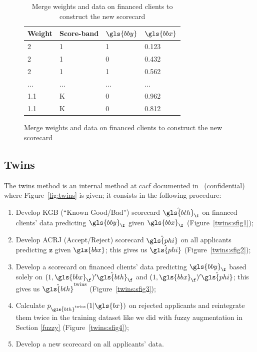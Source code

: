 \begin{table}
{\begin{multicols}{3}
\columnbreak

\begin{subfigure}[t]{0.31\textwidth}
\begin{center}
\begin{adjustbox}{max width=0.95\textwidth}

\begin{tabular}{l l l l}
\toprule
\textbf{Weight} & \textbf{Score-band} & \textbf{${\gls{bby}}$} & \textbf{${\gls{bbx}}$}\\
\midrule
2 & 1 & 1 & 0.123 \\
2 & 1 & 0 & 0.432 \\
2 & 1 & 1 & 0.562 \\
... & ... & ... & ... \\
1.1 & K & 0 & 0.962 \\
1.1 & K & 0 & 0.812 \\
\bottomrule
\end{tabular}
\end{adjustbox}
\end{center}

\caption{Merge weights and data on financed clients to construct the new scorecard}
\label{augment:sfig3}
\end{subfigure}
\end{multicols}
}
\end{table}

\subsection{Twins} \label{Twins}

The twins method is an internal method at \gls{cacf} documented in~\cite{groupe} (confidential) where Figure~\ref{fig:twins} is given; it consists in the following procedure:
\begin{enumerate}
\item Develop KGB (``Known Good/Bad'') scorecard $\hat{\gls{bth}}_\f$ on financed clients' data predicting $\gls{bby}_\f$ given $\gls{bbx}_\f$ (Figure~\ref{twins:sfig1});
\item Develop ACRJ (Accept/Reject) scorecard $\hat{\gls{phi}}$ on all applicants predicting $\mathbf{\bm{z}}$ given $\gls{bbx}$; this gives us $\hat{\gls{phi}}$ (Figure~\ref{twins:sfig2});
\item Develop a scorecard on financed clients' data predicting $\gls{bby}_\f$ based solely on $(1,\gls{bbx}_\f)' \hat{\gls{bth}}_\f$ and $(1,\gls{bbx}_\f)' \hat{\gls{phi}}$; this gives us $\hat{\gls{bth}}^{\text{twins}}$ (Figure~\ref{twins:sfig3});
\item Calculate $p_{\hat{\gls{bth}}^{\text{twins}}}(1 | \gls{bx})$ on rejected applicants and reintegrate them twice in the training dataset like we did with fuzzy augmentation in Section \ref{fuzzy} (Figure~\ref{twins:sfig4});
\item Develop a new scorecard on all applicants' data.
\end{enumerate}

